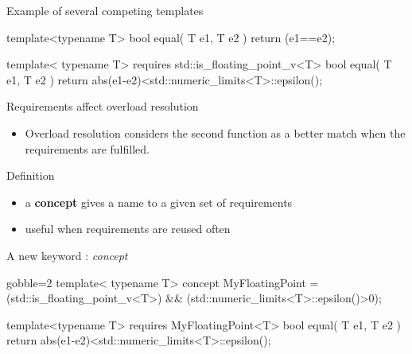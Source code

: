 \begin{frame}[fragile]
  \begin{exampleblock}{Example of several competing templates}
    \small
    \begin{cppcode*}{}
    template<typename T>
    bool equal( T e1, T e2 ) { return (e1==e2); }

    template< typename T>
    requires std::is_floating_point_v<T>
    bool equal( T e1, T e2 )
    { return abs(e1-e2)<std::numeric_limits<T>::epsilon(); }
    \end{cppcode*}
  \end{exampleblock}
  \begin{block}{Requirements affect overload resolution}
    \begin{itemize}
      \item Overload resolution considers the second function as a better match when the requirements are fulfilled.
    \end{itemize}
  \end{block}
\end{frame}

\begin{frame}[fragile]
    \begin{block}{Definition}
      \begin{itemize}
      \item a \textbf{concept} gives a name to a given set of requirements
      \item useful when requirements are reused often
      \end{itemize}
    \end{block}
    \begin{exampleblock}{A new keyword : {\it concept}}
      \small
      \begin{cppcode*}{gobble=2}
      template< typename T>
      concept MyFloatingPoint =
        (std::is_floating_point_v<T>) &&
        (std::numeric_limits<T>::epsilon()>0);

      template<typename T>
      requires MyFloatingPoint<T>
      bool equal( T e1, T e2 )
      { return abs(e1-e2)<std::numeric_limits<T>::epsilon(); }
      \end{cppcode*}
    \end{exampleblock}
\end{frame}

